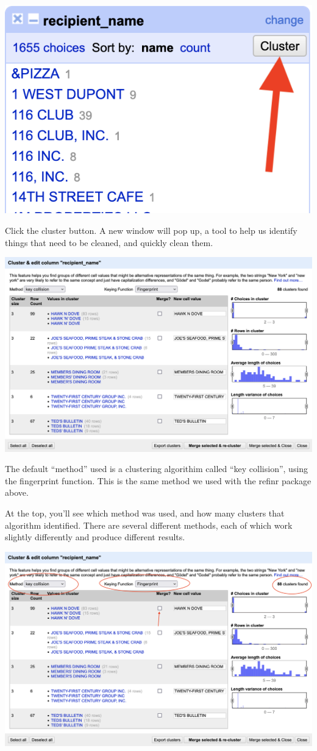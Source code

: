 \documentclass[
  letterpaper,
  DIV=11,
  numbers=noendperiod]{scrreprt}
\begin{document}
\includegraphics{./images/open4.png}

Click the cluster button. A new window will pop up, a tool to help us
identify things that need to be cleaned, and quickly clean them.

\includegraphics{./images/open5.png}

The default ``method'' used is a clustering algorithim called ``key
collision'', using the fingerprint function. This is the same method we
used with the refinr package above.

At the top, you'll see which method was used, and how many clusters that
algorithm identified. There are several different methods, each of which
work slightly differently and produce different results.

\includegraphics{./images/open6.png}
\end{document}
